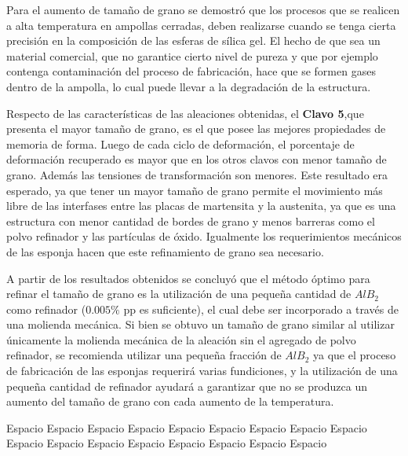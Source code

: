 \documentclass[a4paper,12pt,fleqn,twoside,openany]{book}
\begin{document}
Para el aumento de tamaño de grano se demostró que los procesos que se realicen a alta temperatura en ampollas cerradas, deben realizarse cuando se tenga cierta precisión en la composición de las esferas de sílica gel. El hecho de que sea un material comercial, que no garantice cierto nivel de pureza y que por ejemplo contenga contaminación del proceso de fabricación, hace que se formen gases dentro de la ampolla, lo cual puede llevar a la degradación de la estructura. 

Respecto de las características de las aleaciones obtenidas, el \textbf{Clavo 5},que presenta el mayor tamaño de grano, es el que posee las mejores propiedades de memoria de forma. Luego de cada ciclo de deformación, el porcentaje de deformación recuperado es mayor que en los otros clavos con menor tamaño de grano. Además las tensiones de transformación son menores. Este resultado era esperado, ya que tener un mayor tamaño de grano permite el movimiento más libre de las interfases entre las placas de martensita y la austenita, ya que es una estructura con menor cantidad de bordes de grano y menos barreras como el polvo refinador y las partículas de óxido. Igualmente los requerimientos mecánicos de las esponja hacen que este refinamiento de grano sea necesario.

A partir de los resultados obtenidos se concluyó que el método óptimo para refinar el tamaño de grano es la utilización de una pequeña cantidad de $AlB_2$ como refinador ($0.005 \%$ pp es suficiente), el cual debe ser incorporado a través de una molienda mecánica. Si bien se obtuvo un tamaño de grano similar al utilizar únicamente la molienda mecánica de la aleación sin el agregado de polvo refinador, se recomienda utilizar una pequeña fracción de $AlB_2$ ya que el proceso de fabricación de las esponjas requerirá varias fundiciones, y la utilización de una pequeña cantidad de refinador ayudará a garantizar que no se produzca un aumento del tamaño de grano con cada aumento de la temperatura.


Espacio \newline
Espacio \newline
Espacio \newline
Espacio \newline
Espacio \newline
Espacio \newline
Espacio \newline
Espacio \newline
Espacio \newline
Espacio \newline
Espacio \newline
Espacio \newline
Espacio \newline
Espacio \newline
Espacio \newline
Espacio \newline
Espacio \newline
\end{document}
